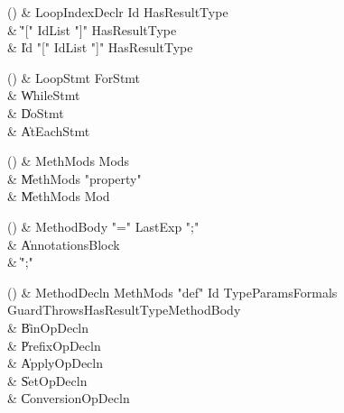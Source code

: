 \begin{bbgrammarappendix}{3.6in}

() & LoopIndexDeclr \label{prod:LoopIndexDeclr}  \: Id HasResultType\opt  \\

 &    \| \xcd"[" IdList \xcd"]" HasResultType\opt \\
 &    \| Id \xcd"[" IdList \xcd"]" HasResultType\opt \\

\end{bbgrammarappendix}

\begin{bbgrammarappendix}{4.2in}

() & LoopStmt \label{prod:LoopStmt}  \: ForStmt  \\

 &    \| WhileStmt \\
 &    \| DoStmt \\
 &    \| AtEachStmt \\

\end{bbgrammarappendix}

\begin{bbgrammarappendix}{4.2in}

() & MethMods \label{prod:MethMods}  \: Mods\opt  \\

 &    \| MethMods \xcd"property"  \\
 &    \| MethMods Mod \\

\end{bbgrammarappendix}

\begin{bbgrammarappendix}{4.0in}

() & MethodBody \label{prod:MethodBody}  \: \xcd"=" LastExp \xcd";"  \\
 &    \| Annotations\opt Block \\
 &    \| \xcd";" \\

\end{bbgrammarappendix}

\begin{bbgrammarappendix}{3.9in}

() & MethodDecln
  \label{prod:MethodDecln}  \: MethMods \xcd"def" Id TypeParams\opt Formals Guard\opt Throws\opt HasResultType\opt MethodBody  \\

 &    \| BinOpDecln \\
 &    \| PrefixOpDecln \\
 &    \| ApplyOpDecln \\
 &    \| SetOpDecln \\
 &    \| ConversionOpDecln \\

\end{bbgrammarappendix}

